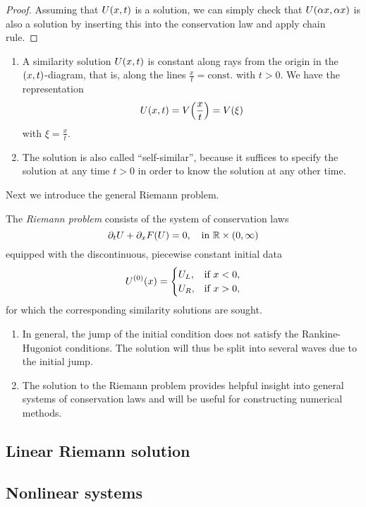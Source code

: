 \begin{proof}
	Assuming that \(U\parentheses*{x, t}\) is a solution, we can simply check that \(U\parentheses*{\alpha x, \alpha x}\) is also a solution by inserting this into the conservation law and apply chain rule.
\end{proof}

\begin{remark}
	\begin{enumerate}
		\item A similarity solution \(U\parentheses*{x, t}\) is constant along rays from the origin in the \(\parentheses*{x, t}\)-diagram, that is, along the lines \(\frac{x}{t} = \text{const.}\) with \(t > 0\).
		We have the representation
		\[
			U\parentheses*{x, t} = V\parentheses*{\frac{x}{t}} = V\parentheses*{\xi}
		\]
		with \(\xi = \frac{x}{t}\).
		\item The solution is also called ``self-similar'', because it suffices to specify the solution at any time \(t > 0\) in order to know the solution at any other time.
	\end{enumerate}
\end{remark}

Next we introduce the general Riemann problem.

\begin{definition}
	The \emph{Riemann problem} consists of the system of conservation laws
	\[
		\partial_t U + \partial_x F\parentheses*{U} = 0, \quad \text{in }\R \times \parentheses*{0, \infty}
	\]
	equipped with the discontinuous, piecewise constant initial data
	\[
		U^{\parentheses*{0}}\parentheses*{x} = \begin{cases}
			U_L, & \text{if }x < 0,\\
			U_R, & \text{if }x > 0,
		\end{cases}
	\]
	for which the corresponding similarity solutions are sought.
\end{definition}

\begin{remark}
	\begin{enumerate}
		\item In general, the jump of the initial condition does not satisfy the Rankine-Hugoniot conditions.
		The solution will thus be split into several waves due to the initial jump.
		\item The solution to the Riemann problem provides helpful insight into general systems of conservation laws and will be useful for constructing numerical methods.
	\end{enumerate}
\end{remark}


\subsection{Linear Riemann solution}


\subsection{Nonlinear systems}
